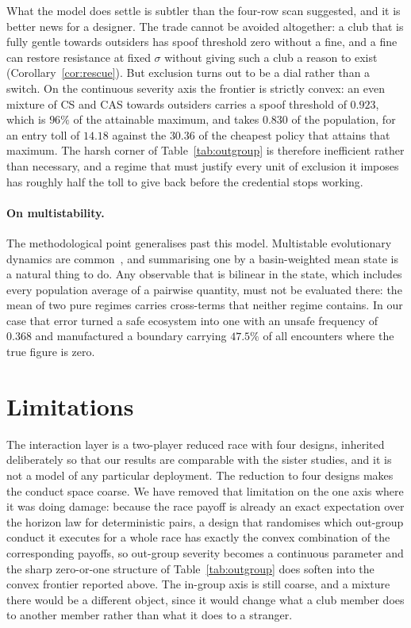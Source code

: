 \documentclass[11pt,a4paper]{article}
\theoremstyle{definition}
\newcommand{\CS}{\textsf{CS}}
\newcommand{\CAS}{\textsf{CAS}}
\begin{document}
What the model does settle is subtler than the four-row scan suggested, and it
is better news for a designer. The trade cannot be avoided altogether: a club
that is fully gentle towards outsiders has spoof threshold zero without a fine,
and a fine can restore resistance at fixed $\sigma$ without giving such a club
a reason to exist (Corollary~\ref{cor:rescue}). But exclusion turns out to be a
dial rather than a switch. On the continuous severity axis the frontier is
strictly convex: an even mixture of \CS{} and \CAS{} towards outsiders carries
a spoof threshold of $0.923$, which is $96\%$ of the attainable maximum, and
takes $0.830$ of the population, for an entry toll of $14.18$ against the
$30.36$ of the cheapest policy that attains that maximum. The harsh corner of
Table~\ref{tab:outgroup} is therefore inefficient rather than necessary, and a
regime that must justify every unit of exclusion it imposes has roughly half
the toll to give back before the credential stops working.

\paragraph{On multistability.} The methodological point generalises past this
model. Multistable evolutionary dynamics are
common~\citep{hofbauer1998evolutionary,sandholm2010population}, and summarising one
by a basin-weighted mean state is a natural thing to do. Any observable that is
bilinear in the state, which includes every population average of a pairwise
quantity, must not be evaluated there: the mean of two pure regimes carries
cross-terms that neither regime contains. In our case that error turned a safe
ecosystem into one with an unsafe frequency of $0.368$ and manufactured a
boundary carrying $47.5\%$ of all encounters where the true figure is zero.

\section{Limitations}
\label{sec:limitations}

The interaction layer is a two-player reduced race with four designs, inherited
deliberately so that our results are comparable with the sister studies, and it
is not a model of any particular deployment. The reduction to four designs
makes the conduct space coarse. We have removed that limitation on the one axis
where it was doing damage: because the race payoff is already an exact
expectation over the horizon law for deterministic pairs, a design that
randomises which out-group conduct it executes for a whole race has exactly the
convex combination of the corresponding payoffs, so out-group severity becomes
a continuous parameter and the sharp zero-or-one structure of
Table~\ref{tab:outgroup} does soften into the convex frontier reported above.
The in-group axis is still coarse, and a mixture there would be a different
object, since it would change what a club member does to another member rather
than what it does to a stranger.
\end{document}
